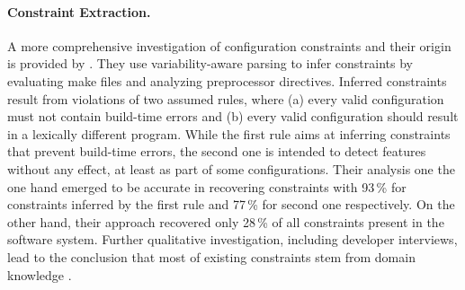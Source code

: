 \paragraph{Constraint Extraction.} 
A more comprehensive investigation of configuration
constraints and their origin is provided by \cite{nadi_mining_2014,nadi_where_2015}. They use variability-aware parsing to infer constraints by
evaluating make files and  analyzing preprocessor directives. Inferred
constraints result from violations of two assumed rules, where (a) every valid
configuration must not contain build-time errors and (b) every valid
configuration should result in a lexically different program. While the
first rule aims at inferring constraints that prevent build-time errors, the
second one is intended to detect features without any effect, at least as part
of some configurations. Their analysis one the one hand emerged to be accurate
in recovering constraints with 93\,\% for constraints inferred by the first rule
and 77\,\% for second one respectively. On the other hand, their approach
recovered only 28\,\% of all constraints present in the software system.
Further qualitative investigation, including developer interviews, lead to
the conclusion that most of existing constraints stem from domain knowledge
\citep{nadi_where_2015}.

